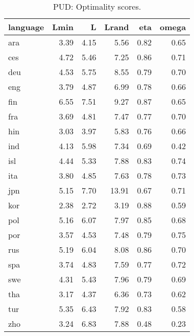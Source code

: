 \begin{table}[H]
\centering
\caption{PUD: Optimality scores.} 
\label{tab:opt_scores_pud}
\begin{tabular}{lrrrrr}
  \hline
language & Lmin & L & Lrand & eta & omega \\ 
  \hline
ara & 3.39 & 4.15 & 5.56 & 0.82 & 0.65 \\ 
  ces & 4.72 & 5.46 & 7.25 & 0.86 & 0.71 \\ 
  deu & 4.53 & 5.75 & 8.55 & 0.79 & 0.70 \\ 
  eng & 3.79 & 4.87 & 6.99 & 0.78 & 0.66 \\ 
  fin & 6.55 & 7.51 & 9.27 & 0.87 & 0.65 \\ 
  fra & 3.69 & 4.81 & 7.47 & 0.77 & 0.70 \\ 
  hin & 3.03 & 3.97 & 5.83 & 0.76 & 0.66 \\ 
  ind & 4.13 & 5.98 & 7.34 & 0.69 & 0.42 \\ 
  isl & 4.44 & 5.33 & 7.88 & 0.83 & 0.74 \\ 
  ita & 3.80 & 4.85 & 7.63 & 0.78 & 0.73 \\ 
  jpn & 5.15 & 7.70 & 13.91 & 0.67 & 0.71 \\ 
  kor & 2.38 & 2.72 & 3.19 & 0.88 & 0.59 \\ 
  pol & 5.16 & 6.07 & 7.97 & 0.85 & 0.68 \\ 
  por & 3.57 & 4.53 & 7.48 & 0.79 & 0.75 \\ 
  rus & 5.19 & 6.04 & 8.08 & 0.86 & 0.70 \\ 
  spa & 3.74 & 4.83 & 7.59 & 0.77 & 0.72 \\ 
  swe & 4.31 & 5.43 & 7.96 & 0.79 & 0.69 \\ 
  tha & 3.17 & 4.37 & 6.36 & 0.73 & 0.62 \\ 
  tur & 5.35 & 6.43 & 7.92 & 0.83 & 0.58 \\ 
  zho & 3.24 & 6.83 & 7.88 & 0.48 & 0.23 \\ 
   \hline
\end{tabular}
\end{table}
